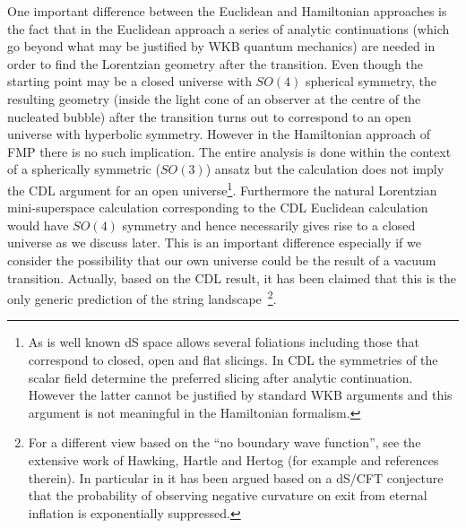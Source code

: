 \documentclass[a4paper,11pt]{article}
\numberwithin{equation}{section}
\begin{document}
One important difference between the Euclidean and Hamiltonian approaches is the fact that in the Euclidean approach a series of analytic continuations (which go beyond what may be justified by WKB quantum mechanics) are needed in order to find the  Lorentzian geometry after the transition. Even though the starting point may be a closed universe with $SO(4)$ spherical symmetry, the resulting geometry (inside the light cone of an observer at the centre of the nucleated bubble) after the transition turns out to correspond to an open universe with hyperbolic symmetry. However in the Hamiltonian approach of FMP there is no such implication. The entire analysis is done within the context of a spherically symmetric ($SO(3)$) ansatz   but the calculation does not imply the CDL argument for an open universe\footnote{As is well known dS space allows several foliations including those that correspond to closed, open and flat slicings. In CDL the symmetries  of the scalar field determine the preferred slicing after analytic continuation. However the latter cannot be justified by standard WKB arguments and this argument is not meaningful in the Hamiltonian formalism.}. Furthermore the natural Lorentzian mini-superspace calculation corresponding to the CDL Euclidean calculation would have $SO(4)$ symmetry and hence necessarily gives rise to a closed universe as we discuss later. This is an important difference especially if we consider the possibility that our own universe could be the result of a vacuum transition. Actually, based on the CDL result, it has been claimed that this is the only generic prediction of the string landscape~\cite{Freivogel:2005vv, Kleban:2012ph}\footnote{For a different view based on the ``no boundary wave function'', see the extensive work of Hawking, Hartle and Hertog (for example \cite{Hartle:2013oda}  and references therein). In particular in \cite{Hawking:2017wrd} it has been argued based on a dS/CFT conjecture that the probability of observing negative curvature on exit from eternal inflation is exponentially suppressed.
}. 
\end{document}
